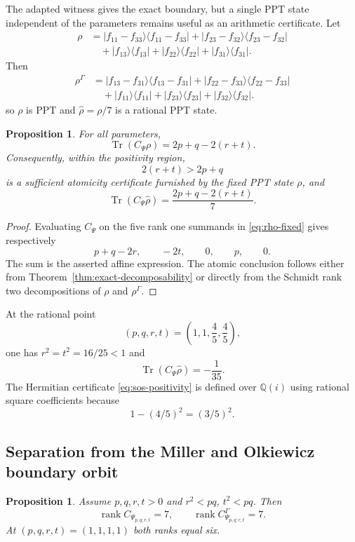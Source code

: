 \documentclass[11pt]{amsart}
\newcommand{\chg}[1]{#1}
\newcommand{\rank}{\operatorname{rank}}
\newcommand{\Tr}{\operatorname{Tr}}
\theoremstyle{plain}
\newtheorem{proposition}[theorem]{Proposition}
\theoremstyle{definition}
\theoremstyle{remark}
\begin{document}
The adapted witness gives the exact boundary, but a single PPT state \chg{independent of the parameters} remains useful as an arithmetic certificate. Let
\begin{align}
\rho&=|f_{11}-f_{33}\rangle\langle f_{11}-f_{33}|
+|f_{23}-f_{32}\rangle\langle f_{23}-f_{32}|\label{eq:rho-fixed}\\
&\quad+|f_{13}\rangle\langle f_{13}|+|f_{22}\rangle\langle f_{22}|+|f_{31}\rangle\langle f_{31}|.\nonumber
\end{align}
Then
\[
\begin{aligned}
\rho^\Gamma
&=|f_{13}-f_{31}\rangle\langle f_{13}-f_{31}|
+|f_{22}-f_{33}\rangle\langle f_{22}-f_{33}|\\
&\quad+|f_{11}\rangle\langle f_{11}|+|f_{23}\rangle\langle f_{23}|+|f_{32}\rangle\langle f_{32}|.
\end{aligned}
\]
so $\rho$ is PPT and $\widehat\rho=\rho/7$ is a rational PPT state.

\begin{proposition}\label{prop:fixed-certificate}
For all parameters,
\[
\Tr(C_\Psi\rho)=2p+q-2(r+t).
\]
Consequently, within the positivity region,
\[
2(r+t)>2p+q
\]
is a \chg{sufficient atomicity certificate furnished by the fixed PPT state $\rho$}, and
\[
\Tr(C_\Psi\widehat\rho)=\frac{2p+q-2(r+t)}7.
\]
\end{proposition}

\begin{proof}
Evaluating $C_\Psi$ on the five \chg{rank one} summands in \eqref{eq:rho-fixed} gives respectively
\[
p+q-2r,\qquad -2t,\qquad0,\qquad p,\qquad0.
\]
The sum is the asserted affine expression. The atomic conclusion follows either from Theorem~\ref{thm:exact-decomposability} or directly from the \chg{Schmidt rank two} decompositions of $\rho$ and $\rho^\Gamma$.
\end{proof}

At the rational point
\[
(p,q,r,t)=\left(1,1,\frac45,\frac45\right),
\]
one has $r^2=t^2=16/25<1$ and
\[
\Tr(C_\Psi\widehat\rho)=-\frac1{35}.
\]
The Hermitian certificate \eqref{eq:sos-positivity} is defined over $\mathbb Q(i)$ using rational square coefficients because
\[
1-(4/5)^2=(3/5)^2.
\]

\subsection{Separation from the Miller and Olkiewicz boundary orbit}

\begin{proposition}\label{prop:rank-separation}
Assume $p,q,r,t>0$ and $r^2<pq$, $t^2<pq$. Then
\[
\rank C_{\Psi_{p,q;r,t}}=7,
\qquad
\rank C_{\Psi_{p,q;r,t}}^\Gamma=7.
\]
At $(p,q,r,t)=(1,1,1,1)$ both ranks equal six.
\end{proposition}
\end{document}
